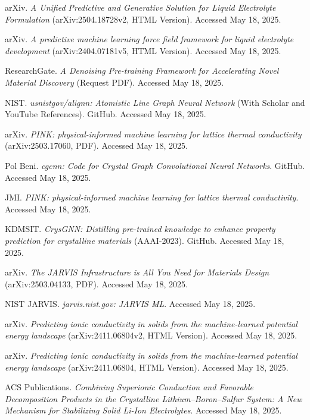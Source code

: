 \documentclass[letterpaper]{article} %
\begin{document}
\begin{thebibliography}{99}
 arXiv. \textit{A Unified Predictive and Generative Solution for Liquid Electrolyte Formulation} (arXiv:2504.18728v2, HTML Version). Accessed May 18, 2025.

 arXiv. \textit{A predictive machine learning force field framework for liquid electrolyte development} (arXiv:2404.07181v5, HTML Version). Accessed May 18, 2025.

 ResearchGate. \textit{A Denoising Pre-training Framework for Accelerating Novel Material Discovery} (Request PDF). Accessed May 18, 2025.

 NIST. \textit{usnistgov/alignn: Atomistic Line Graph Neural Network} (With Scholar and YouTube References). GitHub. Accessed May 18, 2025.

 arXiv. \textit{PINK: physical-informed machine learning for lattice thermal conductivity} (arXiv:2503.17060, PDF). Accessed May 18, 2025.

 Pol Beni. \textit{cgcnn: Code for Crystal Graph Convolutional Neural Networks}. GitHub. Accessed May 18, 2025.

 JMI. \textit{PINK: physical-informed machine learning for lattice thermal conductivity}. Accessed May 18, 2025.

 KDMSIT. \textit{CrysGNN: Distilling pre-trained knowledge to enhance property prediction for crystalline materials} (AAAI-2023). GitHub. Accessed May 18, 2025.

 arXiv. \textit{The JARVIS Infrastructure is All You Need for Materials Design} (arXiv:2503.04133, PDF). Accessed May 18, 2025.

 NIST JARVIS. \textit{jarvis.nist.gov: JARVIS ML}. Accessed May 18, 2025.

 arXiv. \textit{Predicting ionic conductivity in solids from the machine-learned potential energy landscape} (arXiv:2411.06804v2, HTML Version). Accessed May 18, 2025.

 arXiv. \textit{Predicting ionic conductivity in solids from the machine-learned potential energy landscape} (arXiv:2411.06804, HTML Version). Accessed May 18, 2025.

 ACS Publications. \textit{Combining Superionic Conduction and Favorable Decomposition Products in the Crystalline Lithium–Boron–Sulfur System: A New Mechanism for Stabilizing Solid Li-Ion Electrolytes}. Accessed May 18, 2025.


\end{thebibliography}
\end{document}
